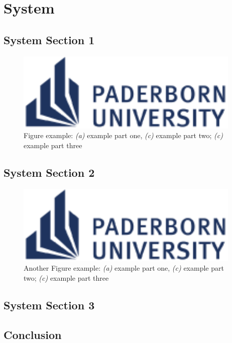 %
\chapter{System}
\label{sec:system}


\Blindtext[2][1]

\section{System Section 1}
\label{sec:system:sec1}

\Blindtext[1][2]

\begin{figure}[htb]
	\includegraphics[width=\textwidth]{gfx/UPB-Logo}
	\caption{Figure example: \textit{(a)} example part one, \textit{(c)} example part two; \textit{(c)} example part three}
	\label{fig:system:example1}
\end{figure}

\Blindtext[1][2]

\section{System Section 2}
\label{sec:system:sec2}

\Blindtext[1][2]

\begin{figure}[htb]
	\includegraphics[width=\textwidth]{gfx/UPB-Logo}
	\caption{Another Figure example: \textit{(a)} example part one, \textit{(c)} example part two; \textit{(c)} example part three}
	\label{fig:system:example2}
\end{figure}

\Blindtext[2][2]

\section{System Section 3}
\label{sec:system:sec3}

\Blindtext[4][2]

\section{Conclusion}
\label{sec:system:conclusion}

\Blindtext[2][1]
